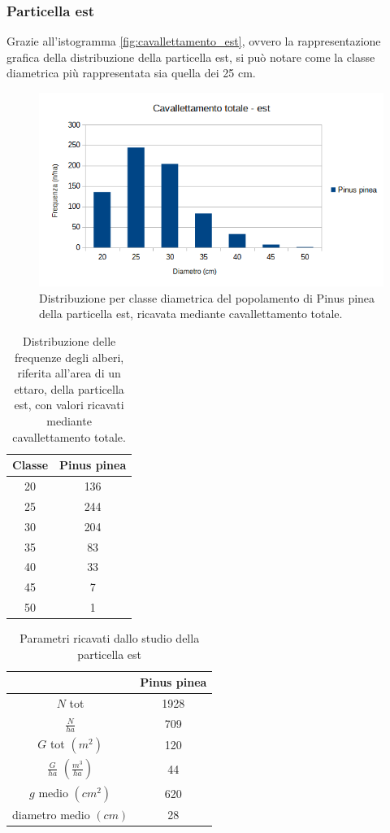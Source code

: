 \subsubsection*{Particella est}
Grazie all'istogramma \autoref{fig:cavallettamento_est}, ovvero la rappresentazione grafica della distribuzione della particella est, si può notare come la classe diametrica più rappresentata sia quella dei 25 cm.
\begin{figure}[H]
    \centering
    \includegraphics[width=0.7 \textwidth]{immagini/cav-tot-est.png}
    \caption{Distribuzione per classe diametrica del popolamento di Pinus pinea della particella est, ricavata mediante cavallettamento totale.}
    \label{fig:cavallettamento_est}
\end{figure}
\begin{table}[H]
\caption{Distribuzione delle frequenze degli alberi, riferita all'area di un ettaro, della particella est, con valori ricavati mediante cavallettamento totale.}
\centering
\begin{tabular}{cc}
\toprule
Classe & Pinus pinea \\
\midrule
20     & 136         \\
25     & 244         \\
30     & 204         \\
35     & 83          \\
40     & 33          \\
45     & 7           \\
50     & 1           \\ 
\bottomrule
\end{tabular}
\label{tab:tab_freq_cav_est}
\end{table}

\begin{table}[H]
  \caption{Parametri ricavati dallo studio della particella est}
    \centering
    \begin{tabular}{cc}
     \toprule
       & Pinus pinea \\
       \midrule
        $N$ tot & 1928 \\
        $\frac{N}{ha}$ & 709 \\
        $G$ tot $(m^2)$ & 120 \\
        $\frac{G}{ha}$ $(\frac{m^3}{ha})$ & 44\\
        $g$ medio $(cm^2)$ & 620 \\
        diametro medio $(cm)$ & 28\\
       \bottomrule
        \end{tabular}
    \label{tab:tab_cav_est}
\end{table}

